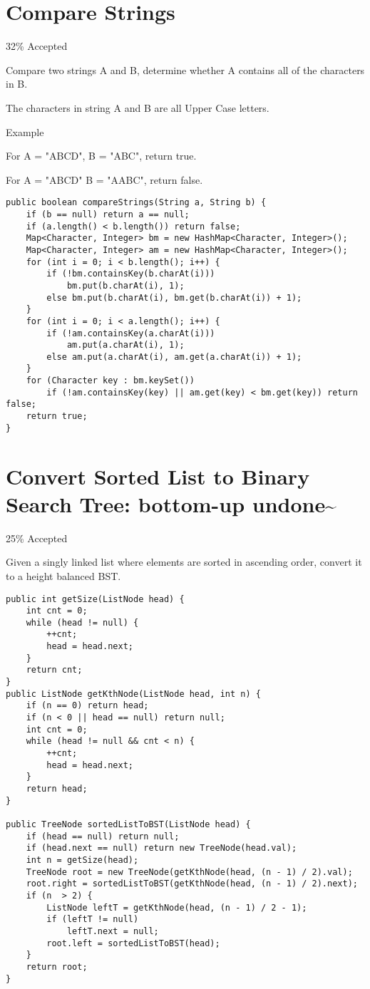 \documentclass[9pt, b5paaper]{book}
\begin{document}
\section{Compare Strings}
\label{sec-1-25}

32\% Accepted

Compare two strings A and B, determine whether A contains all of the characters in B.

The characters in string A and B are all Upper Case letters.

Example

For A = "ABCD", B = "ABC", return true.

For A = "ABCD" B = "AABC", return false.
\begin{verbatim}
public boolean compareStrings(String a, String b) {
    if (b == null) return a == null;
    if (a.length() < b.length()) return false;
    Map<Character, Integer> bm = new HashMap<Character, Integer>();
    Map<Character, Integer> am = new HashMap<Character, Integer>();
    for (int i = 0; i < b.length(); i++) {
        if (!bm.containsKey(b.charAt(i)))
            bm.put(b.charAt(i), 1);
        else bm.put(b.charAt(i), bm.get(b.charAt(i)) + 1);
    }
    for (int i = 0; i < a.length(); i++) {
        if (!am.containsKey(a.charAt(i)))
            am.put(a.charAt(i), 1);
        else am.put(a.charAt(i), am.get(a.charAt(i)) + 1);
    }
    for (Character key : bm.keySet()) 
        if (!am.containsKey(key) || am.get(key) < bm.get(key)) return false;
    return true;
}
\end{verbatim}
\section{Convert Sorted List to Binary Search Tree: bottom-up undone\textasciitilde{}~}
\label{sec-1-26}

25\% Accepted

Given a singly linked list where elements are sorted in ascending order, convert it to a height balanced BST.
\begin{verbatim}
public int getSize(ListNode head) {
    int cnt = 0;
    while (head != null) {
        ++cnt;
        head = head.next;
    }
    return cnt;
}
public ListNode getKthNode(ListNode head, int n) {
    if (n == 0) return head;
    if (n < 0 || head == null) return null;
    int cnt = 0;
    while (head != null && cnt < n) {
        ++cnt;
        head = head.next;
    }
    return head;
}
        
public TreeNode sortedListToBST(ListNode head) {
    if (head == null) return null;
    if (head.next == null) return new TreeNode(head.val);
    int n = getSize(head);
    TreeNode root = new TreeNode(getKthNode(head, (n - 1) / 2).val);
    root.right = sortedListToBST(getKthNode(head, (n - 1) / 2).next);
    if (n  > 2) {
        ListNode leftT = getKthNode(head, (n - 1) / 2 - 1);  
        if (leftT != null) 
            leftT.next = null;
        root.left = sortedListToBST(head);
    }
    return root;
}
\end{verbatim}
\end{document}
